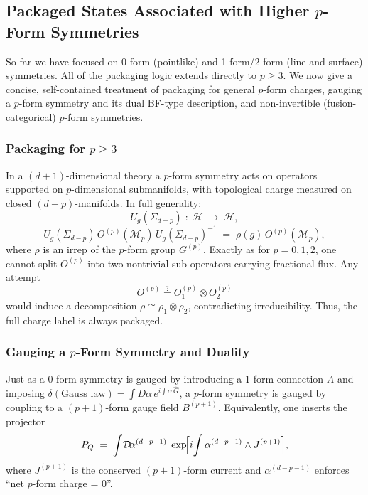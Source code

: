 \documentclass[12pt,a4paper]{article}
\begin{document}
\subsection{Packaged States Associated with Higher $p$-Form Symmetries}
\label{SEC:HigherPForm}


So far we have focused on 0-form (pointlike) and 1-form/2-form (line and surface) symmetries.
All of the packaging logic extends directly to $p\ge3$.
We now give a concise, self-contained treatment of packaging for general $p$-form charges, gauging a $p$-form symmetry and its dual BF-type description, and non-invertible (fusion-categorical) $p$-form symmetries.



\subsubsection{Packaging for $p\ge3$}

In a $(d+1)$-dimensional theory a $p$-form symmetry acts on operators supported on $p$-dimensional submanifolds, with topological charge measured on closed $(d-p)$-manifolds.
In full generality:
\[
U_g(\Sigma_{d-p}) \;:\; \mathcal{H}\;\longrightarrow\;\mathcal{H},
\]
\[
U_g(\Sigma_{d-p})\,O^{(p)}(\mathcal M_p)\,U_g(\Sigma_{d-p})^{-1}
\;=\;
\rho(g)\,O^{(p)}(\mathcal M_p),
\]
where $\rho$ is an irrep of the $p$-form group $G^{(p)}$.
Exactly as for $p=0,1,2$, one cannot split $O^{(p)}$ into two nontrivial sub-operators carrying fractional flux.
Any attempt
\[
O^{(p)}\stackrel{?}{=}O_1^{(p)}\otimes O_2^{(p)}
\]
would induce a decomposition $\rho\cong\rho_1\otimes\rho_2$, contradicting irreducibility.
Thus, the full charge label is always packaged.



\subsubsection{Gauging a $p$-Form Symmetry and Duality}

Just as a 0-form symmetry is gauged by introducing a 1-form connection $A$ and imposing
$\delta(\text{Gauss law})=\int D\alpha\,e^{i\!\int \alpha\,\hat G}$, a $p$-form symmetry is gauged by coupling to a $(p+1)$-form gauge field $B^{(p+1)}$.
Equivalently, one inserts the projector
\[
P_Q
\;=\;
\int\!\mathcal D\!\alpha^{(d-p-1)}\;
\exp\!\Bigl[i\!\int \alpha^{(d-p-1)}\wedge J^{(p+1)}\Bigr],
\]
where $J^{(p+1)}$ is the conserved $(p+1)$-form current and $\alpha^{(d-p-1)}$ enforces ``net $p$-form charge = 0''.
\end{document}
